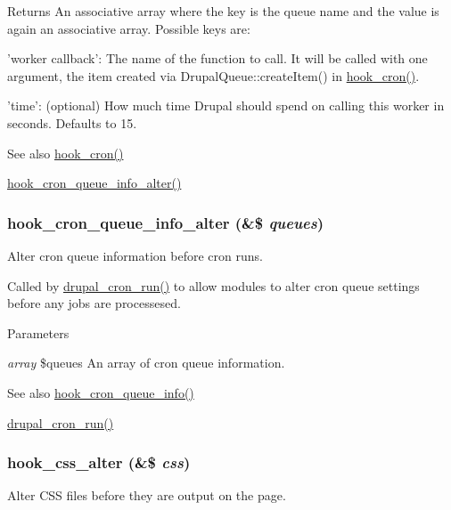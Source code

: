 \begin{DoxyReturn}{Returns}
An associative array where the key is the queue name and the value is again an associative array. Possible keys are:
\begin{DoxyItemize}
\item 'worker callback': The name of the function to call. It will be called with one argument, the item created via DrupalQueue::createItem() in \hyperlink{group__hooks_gaf07f1e3d98112fc2ba6920cf7ee6fb16}{hook\_\-cron()}.
\item 'time': (optional) How much time Drupal should spend on calling this worker in seconds. Defaults to 15.
\end{DoxyItemize}
\end{DoxyReturn}
\begin{DoxySeeAlso}{See also}
\hyperlink{group__hooks_gaf07f1e3d98112fc2ba6920cf7ee6fb16}{hook\_\-cron()} 

\hyperlink{group__hooks_gac9c5a8cc07a343c560e5ffac4a7de41f}{hook\_\-cron\_\-queue\_\-info\_\-alter()} 
\end{DoxySeeAlso}
\hypertarget{group__hooks_gac9c5a8cc07a343c560e5ffac4a7de41f}{
\subsubsection[{hook\_\-cron\_\-queue\_\-info\_\-alter}]{\setlength{\rightskip}{0pt plus 5cm}hook\_\-cron\_\-queue\_\-info\_\-alter (\&\$ {\em queues})}}
\label{group__hooks_gac9c5a8cc07a343c560e5ffac4a7de41f}
Alter cron queue information before cron runs.

Called by \hyperlink{common_8inc_a1d4a4362b30215023a7120b627a9fd4f}{drupal\_\-cron\_\-run()} to allow modules to alter cron queue settings before any jobs are processesed.


\begin{DoxyParams}{Parameters}
\item[{\em array}]\$queues An array of cron queue information.\end{DoxyParams}
\begin{DoxySeeAlso}{See also}
\hyperlink{group__hooks_gae161ed78fd5e8775ffc9264346a64320}{hook\_\-cron\_\-queue\_\-info()} 

\hyperlink{common_8inc_a1d4a4362b30215023a7120b627a9fd4f}{drupal\_\-cron\_\-run()} 
\end{DoxySeeAlso}
\hypertarget{group__hooks_ga5337e8bfa5713fb37c132f039c0169da}{
\subsubsection[{hook\_\-css\_\-alter}]{\setlength{\rightskip}{0pt plus 5cm}hook\_\-css\_\-alter (\&\$ {\em css})}}
\label{group__hooks_ga5337e8bfa5713fb37c132f039c0169da}
Alter CSS files before they are output on the page.


